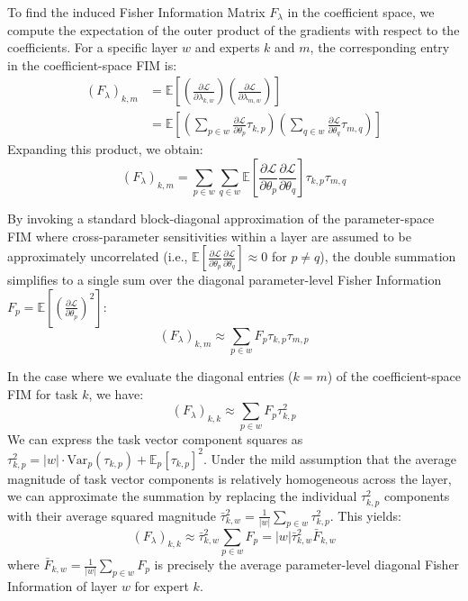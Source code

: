 \documentclass{article}
\theoremstyle{plain}
\theoremstyle{definition}
\theoremstyle{remark}
\begin{document}
To find the induced Fisher Information Matrix $F_{\lambda}$ in the coefficient space, we compute the expectation of the outer product of the gradients with respect to the coefficients. For a specific layer $w$ and experts $k$ and $m$, the corresponding entry in the coefficient-space FIM is:
\begin{equation}
\begin{split}
(F_{\lambda})_{k, m} &= \mathbb{E} \left[ \left(\frac{\partial \mathcal{L}}{\partial \lambda_{k, w}}\right) \left(\frac{\partial \mathcal{L}}{\partial \lambda_{m, w}}\right) \right] \\
&= \mathbb{E} \left[ \left( \sum_{p \in w} \frac{\partial \mathcal{L}}{\partial \theta_p} \tau_{k, p} \right) \left( \sum_{q \in w} \frac{\partial \mathcal{L}}{\partial \theta_q} \tau_{m, q} \right) \right]
\end{split}
\end{equation}
Expanding this product, we obtain:
\begin{equation}
(F_{\lambda})_{k, m} = \sum_{p \in w} \sum_{q \in w} \mathbb{E} \left[ \frac{\partial \mathcal{L}}{\partial \theta_p} \frac{\partial \mathcal{L}}{\partial \theta_q} \right] \tau_{k, p} \tau_{m, q}
\end{equation}

By invoking a standard block-diagonal approximation of the parameter-space FIM where cross-parameter sensitivities within a layer are assumed to be approximately uncorrelated (i.e., $\mathbb{E} \left[ \frac{\partial \mathcal{L}}{\partial \theta_p} \frac{\partial \mathcal{L}}{\partial \theta_q} \right] \approx 0$ for $p \neq q$), the double summation simplifies to a single sum over the diagonal parameter-level Fisher Information $F_p = \mathbb{E} \left[ \left(\frac{\partial \mathcal{L}}{\partial \theta_p}\right)^2 \right]$:
\begin{equation}
(F_{\lambda})_{k, m} \approx \sum_{p \in w} F_p \tau_{k, p} \tau_{m, p}
\end{equation}

In the case where we evaluate the diagonal entries ($k = m$) of the coefficient-space FIM for task $k$, we have:
\begin{equation}
(F_{\lambda})_{k, k} \approx \sum_{p \in w} F_p \tau_{k, p}^2
\end{equation}
We can express the task vector component squares as $\tau_{k, p}^2 = |w| \cdot \text{Var}_p(\tau_{k, p}) + \mathbb{E}_p[\tau_{k, p}]^2$. Under the mild assumption that the average magnitude of task vector components is relatively homogeneous across the layer, we can approximate the summation by replacing the individual $\tau_{k, p}^2$ components with their average squared magnitude $\bar{\tau}_{k, w}^2 = \frac{1}{|w|} \sum_{p \in w} \tau_{k, p}^2$. This yields:
\begin{equation}
(F_{\lambda})_{k, k} \approx \bar{\tau}_{k, w}^2 \sum_{p \in w} F_p = |w| \bar{\tau}_{k, w}^2 \bar{F}_{k, w}
\end{equation}
where $\bar{F}_{k, w} = \frac{1}{|w|} \sum_{p \in w} F_p$ is precisely the average parameter-level diagonal Fisher Information of layer $w$ for expert $k$.
\end{document}
